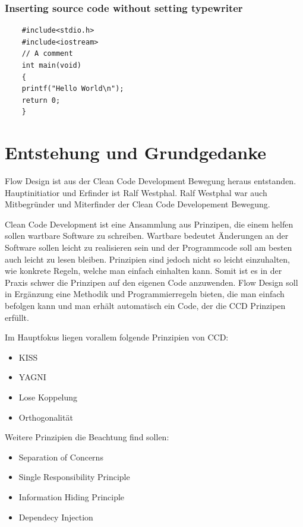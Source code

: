 \documentclass[11pt]{article}
\date{\today}
\title{}
\begin{document}
	






\begin{frame}[fragile]
	\frametitle{Inserting source code without setting typewriter}
	\begin{lstlisting}
	#include<stdio.h>
	#include<iostream>
	// A comment
	int main(void)
	{
	printf("Hello World\n");
	return 0;
	}
	\end{lstlisting}
\end{frame}


	

\tableofcontents

\section{Entstehung und Grundgedanke}
\label{sec:orgheadline1}
Flow Design ist aus der Clean Code Development Bewegung heraus entstanden. Hauptinitiatior und Erfinder ist Ralf Westphal.
Ralf Westphal war auch Mitbegründer und Miterfinder der Clean Code Developement Bewegung.


Clean Code Development ist eine Ansammlung aus Prinzipen, die einem helfen sollen wartbare Software zu schreiben.
Wartbare bedeutet Änderungen an der Software sollen leicht zu realisieren sein und der Programmcode soll
am besten auch leicht zu lesen bleiben.
Prinzipien sind jedoch nicht so leicht einzuhalten, wie konkrete Regeln, welche man einfach einhalten kann.
Somit ist es in der Praxis schwer die Prinzipen auf den eigenen Code anzuwenden.
Flow Design soll in Ergänzung eine Methodik und Programmierregeln bieten, die man einfach befolgen kann und man erhält automatisch
ein Code, der die CCD Prinzipen erfüllt.

Im Hauptfokus liegen vorallem folgende Prinzipien von CCD:
\begin{itemize}
\item KISS
\item YAGNI
\item Lose Koppelung
\item Orthogonalität
\end{itemize}

Weitere Prinzipien die Beachtung find sollen:
\begin{itemize}
\item Separation of Concerns
\item Single Responsibility Principle
\item Information Hiding Principle
\item Dependecy Injection
\end{itemize}
\end{document}
